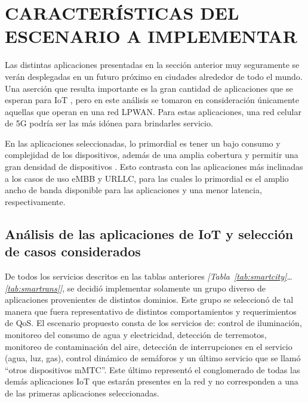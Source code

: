 
\section{CARACTERÍSTICAS DEL ESCENARIO A IMPLEMENTAR}\label{AppsEscenario}

Las distintas aplicaciones presentadas en la sección anterior muy seguramente se verán desplegadas en un futuro próximo en ciudades alrededor de todo el mundo. Una aserción que resulta importante es la gran cantidad de aplicaciones que se esperan para IoT \parencite{Ericsson2019}, pero en este análisis se tomaron en consideración únicamente aquellas que operan en una red LPWAN. Para estas aplicaciones, una red celular de 5G podría ser las más idónea para brindarles servicio. \newline

En las aplicaciones seleccionadas, lo primordial es tener un bajo consumo y complejidad de los dispositivos, además de una amplia cobertura y permitir una gran densidad de dispositivos \parencite{5GAmericas}. Esto contrasta con las aplicaciones más inclinadas a los casos de uso eMBB y URLLC, para las cuales lo primordial es el amplio ancho de banda disponible para las aplicaciones y una menor latencia, respectivamente.

\subsection{Análisis de las aplicaciones de IoT y selección de casos considerados}

De todos los servicios descritos en las tablas anteriores \textit{[Tabla~\ref{tab:smartcity}\ldots \ref{tab:smartrans}]}, se decidió implementar solamente un grupo diverso de aplicaciones provenientes de distintos dominios. Este grupo se seleccionó de tal manera que fuera representativo de distintos comportamientos y requerimientos de QoS. El escenario propuesto consta de los servicios de: control de iluminación, monitoreo del consumo de agua y electricidad, detección de terremotos, monitoreo de contaminación del aire, detección de interrupciones en el servicio (agua, luz, gas), control dinámico de semáforos y un último servicio que se llamó ``otros dispositivos mMTC''. Este último representó el conglomerado de todas las demás aplicaciones IoT que estarán presentes en la red y no corresponden a una de las primeras aplicaciones seleccionadas. \newline

